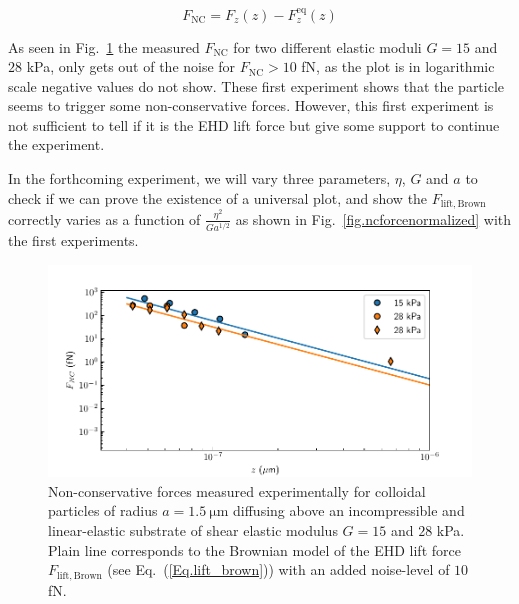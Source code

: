 \begin{equation}
	F_\mathrm{NC} = F_z(z) - F_z ^\mathrm{eq}(z)
\end{equation}

As seen in Fig.~\ref{fig.ncforce} the measured $F_\mathrm{NC}$ for two different elastic moduli $G=15$ and $28$ kPa, only gets out of the noise for $F_\mathrm{NC} > 10$ fN, as the plot is in logarithmic scale negative values do not show. These first experiment shows that the particle seems to trigger some non-conservative forces. However, this first experiment is not sufficient to tell if it is the \gls{EHD} lift force but give some support to continue the experiment.

In the forthcoming experiment, we will vary three parameters, $\eta$, $G$ and $a$ to check if we can prove the existence of a universal plot, and show the $F_\mathrm{lift, Brown}$ correctly varies as a function of $\frac{\eta^2}{Ga^{1/2}} $ as shown in Fig.~\ref{fig.ncforcenormalized} with the first experiments.

\begin{figure}[H]
	\centering
	\includegraphics{02_body/chapter4/images/EHD_forces/EHD_force.pdf}
	\caption{Non-conservative forces measured experimentally for colloidal particles of radius $a=1.5 ~\mathrm{\mu m}$ diffusing above an incompressible and linear-elastic substrate of shear elastic modulus $G=15$ and $28$ kPa. Plain line corresponds to the Brownian model of the \gls{EHD} lift force $F_\mathrm{lift, Brown}$ (see Eq.~(\ref{Eq.lift_brown})) with an added noise-level of $10$ fN.}
	\label{fig.ncforce}
\end{figure}

